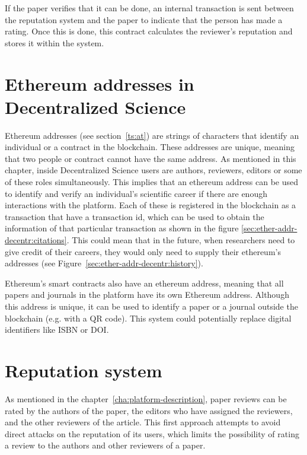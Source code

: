If the paper verifies that it can be done, an internal transaction is sent
between the reputation system and the paper to indicate that the person has made
a rating. Once this is done, this contract calculates the reviewer's reputation
and stores it within the system.

\section{Ethereum addresses in Decentralized Science}
\label{sec:ether-addr-decentr}


Ethereum addresses (see section~\ref{ts:at}) are strings of characters that
identify an individual or a contract in the blockchain. These addresses are
unique, meaning that two people or contract cannot have the same address. As
mentioned in this chapter, inside Decentralized Science users are authors,
reviewers, editors or some of these roles simultaneously. This implies that an
ethereum address can be used to identify and verify an individual's scientific
career if there are enough interactions with the platform. Each of these is
registered in the blockchain as a transaction that have a transaction id, which
can be used to obtain the information of that particular transaction as shown in
the figure \ref{sec:ether-addr-decentr:citations}. This could mean that in the
future, when researchers need to give credit of their careers, they would only
need to supply their ethereum's addresses (see
Figure~\ref{sec:ether-addr-decentr:history}).


Ethereum's smart contracts also have an ethereum address, meaning that all
papers and journals in the platform have its own Ethereum address. Although this
address is unique, it can be used to identify a paper or a journal outside the
blockchain (e.g. with a QR code). This system could potentially replace digital
identifiers like ISBN or DOI.

\section{Reputation system}
\label{rep:system}

As mentioned in the chapter~\ref{cha:platform-description}, paper reviews can be
rated by the authors of the paper, the editors who have assigned the reviewers,
and the other reviewers of the article. This first approach attempts to avoid
direct attacks on the reputation of its users, which limits the possibility of
rating a review to the authors and other reviewers of a paper.


